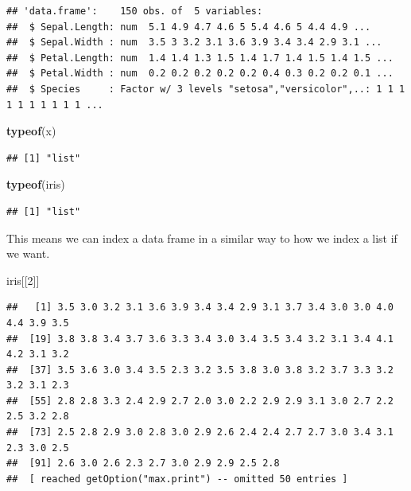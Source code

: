 \documentclass[
]{book}
\newenvironment{Shaded}{\begin{snugshade}}{\end{snugshade}}
\newcommand{\DecValTok}[1]{\textcolor[rgb]{0.00,0.00,0.81}{#1}}
\newcommand{\KeywordTok}[1]{\textcolor[rgb]{0.13,0.29,0.53}{\textbf{#1}}}
\newcommand{\NormalTok}[1]{#1}
\theoremstyle{definition}
\theoremstyle{definition}
\theoremstyle{definition}
\theoremstyle{remark}
\begin{document}
\begin{verbatim}
## 'data.frame':    150 obs. of  5 variables:
##  $ Sepal.Length: num  5.1 4.9 4.7 4.6 5 5.4 4.6 5 4.4 4.9 ...
##  $ Sepal.Width : num  3.5 3 3.2 3.1 3.6 3.9 3.4 3.4 2.9 3.1 ...
##  $ Petal.Length: num  1.4 1.4 1.3 1.5 1.4 1.7 1.4 1.5 1.4 1.5 ...
##  $ Petal.Width : num  0.2 0.2 0.2 0.2 0.2 0.4 0.3 0.2 0.2 0.1 ...
##  $ Species     : Factor w/ 3 levels "setosa","versicolor",..: 1 1 1 1 1 1 1 1 1 1 ...
\end{verbatim}

\begin{Shaded}
\begin{Highlighting}[]
\KeywordTok{typeof}\NormalTok{(x)}
\end{Highlighting}
\end{Shaded}

\begin{verbatim}
## [1] "list"
\end{verbatim}

\begin{Shaded}
\begin{Highlighting}[]
\KeywordTok{typeof}\NormalTok{(iris)}
\end{Highlighting}
\end{Shaded}

\begin{verbatim}
## [1] "list"
\end{verbatim}

This means we can index a data frame in a similar way to how we index a list if we want.

\begin{Shaded}
\begin{Highlighting}[]
\NormalTok{iris[[}\DecValTok{2}\NormalTok{]]}
\end{Highlighting}
\end{Shaded}

\begin{verbatim}
##   [1] 3.5 3.0 3.2 3.1 3.6 3.9 3.4 3.4 2.9 3.1 3.7 3.4 3.0 3.0 4.0 4.4 3.9 3.5
##  [19] 3.8 3.8 3.4 3.7 3.6 3.3 3.4 3.0 3.4 3.5 3.4 3.2 3.1 3.4 4.1 4.2 3.1 3.2
##  [37] 3.5 3.6 3.0 3.4 3.5 2.3 3.2 3.5 3.8 3.0 3.8 3.2 3.7 3.3 3.2 3.2 3.1 2.3
##  [55] 2.8 2.8 3.3 2.4 2.9 2.7 2.0 3.0 2.2 2.9 2.9 3.1 3.0 2.7 2.2 2.5 3.2 2.8
##  [73] 2.5 2.8 2.9 3.0 2.8 3.0 2.9 2.6 2.4 2.4 2.7 2.7 3.0 3.4 3.1 2.3 3.0 2.5
##  [91] 2.6 3.0 2.6 2.3 2.7 3.0 2.9 2.9 2.5 2.8
##  [ reached getOption("max.print") -- omitted 50 entries ]
\end{verbatim}
\end{document}

